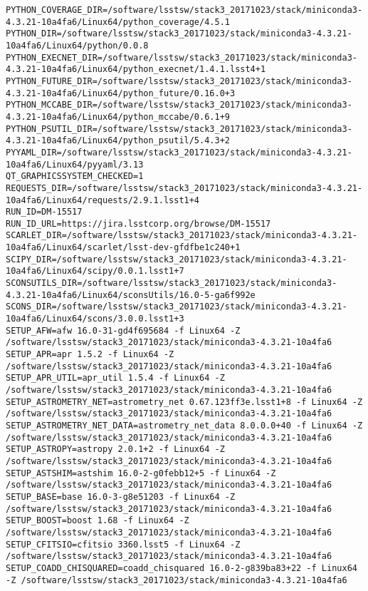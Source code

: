 \begin{verbatim}
PYTHON_COVERAGE_DIR=/software/lsstsw/stack3_20171023/stack/miniconda3-4.3.21-10a4fa6/Linux64/python_coverage/4.5.1
PYTHON_DIR=/software/lsstsw/stack3_20171023/stack/miniconda3-4.3.21-10a4fa6/Linux64/python/0.0.8
PYTHON_EXECNET_DIR=/software/lsstsw/stack3_20171023/stack/miniconda3-4.3.21-10a4fa6/Linux64/python_execnet/1.4.1.lsst4+1
PYTHON_FUTURE_DIR=/software/lsstsw/stack3_20171023/stack/miniconda3-4.3.21-10a4fa6/Linux64/python_future/0.16.0+3
PYTHON_MCCABE_DIR=/software/lsstsw/stack3_20171023/stack/miniconda3-4.3.21-10a4fa6/Linux64/python_mccabe/0.6.1+9
PYTHON_PSUTIL_DIR=/software/lsstsw/stack3_20171023/stack/miniconda3-4.3.21-10a4fa6/Linux64/python_psutil/5.4.3+2
PYYAML_DIR=/software/lsstsw/stack3_20171023/stack/miniconda3-4.3.21-10a4fa6/Linux64/pyyaml/3.13
QT_GRAPHICSSYSTEM_CHECKED=1
REQUESTS_DIR=/software/lsstsw/stack3_20171023/stack/miniconda3-4.3.21-10a4fa6/Linux64/requests/2.9.1.lsst1+4
RUN_ID=DM-15517
RUN_ID_URL=https://jira.lsstcorp.org/browse/DM-15517
SCARLET_DIR=/software/lsstsw/stack3_20171023/stack/miniconda3-4.3.21-10a4fa6/Linux64/scarlet/lsst-dev-gfdfbe1c240+1
SCIPY_DIR=/software/lsstsw/stack3_20171023/stack/miniconda3-4.3.21-10a4fa6/Linux64/scipy/0.0.1.lsst1+7
SCONSUTILS_DIR=/software/lsstsw/stack3_20171023/stack/miniconda3-4.3.21-10a4fa6/Linux64/sconsUtils/16.0-5-ga6f992e
SCONS_DIR=/software/lsstsw/stack3_20171023/stack/miniconda3-4.3.21-10a4fa6/Linux64/scons/3.0.0.lsst1+3
SETUP_AFW=afw 16.0-31-gd4f695684 -f Linux64 -Z /software/lsstsw/stack3_20171023/stack/miniconda3-4.3.21-10a4fa6
SETUP_APR=apr 1.5.2 -f Linux64 -Z /software/lsstsw/stack3_20171023/stack/miniconda3-4.3.21-10a4fa6
SETUP_APR_UTIL=apr_util 1.5.4 -f Linux64 -Z /software/lsstsw/stack3_20171023/stack/miniconda3-4.3.21-10a4fa6
SETUP_ASTROMETRY_NET=astrometry_net 0.67.123ff3e.lsst1+8 -f Linux64 -Z /software/lsstsw/stack3_20171023/stack/miniconda3-4.3.21-10a4fa6
SETUP_ASTROMETRY_NET_DATA=astrometry_net_data 8.0.0.0+40 -f Linux64 -Z /software/lsstsw/stack3_20171023/stack/miniconda3-4.3.21-10a4fa6
SETUP_ASTROPY=astropy 2.0.1+2 -f Linux64 -Z /software/lsstsw/stack3_20171023/stack/miniconda3-4.3.21-10a4fa6
SETUP_ASTSHIM=astshim 16.0-2-g0febb12+5 -f Linux64 -Z /software/lsstsw/stack3_20171023/stack/miniconda3-4.3.21-10a4fa6
SETUP_BASE=base 16.0-3-g8e51203 -f Linux64 -Z /software/lsstsw/stack3_20171023/stack/miniconda3-4.3.21-10a4fa6
SETUP_BOOST=boost 1.68 -f Linux64 -Z /software/lsstsw/stack3_20171023/stack/miniconda3-4.3.21-10a4fa6
SETUP_CFITSIO=cfitsio 3360.lsst5 -f Linux64 -Z /software/lsstsw/stack3_20171023/stack/miniconda3-4.3.21-10a4fa6
SETUP_COADD_CHISQUARED=coadd_chisquared 16.0-2-g839ba83+22 -f Linux64 -Z /software/lsstsw/stack3_20171023/stack/miniconda3-4.3.21-10a4fa6

\end{verbatim}
